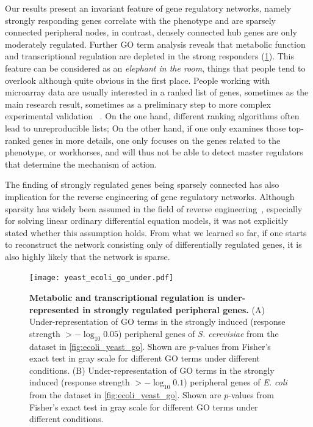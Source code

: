 Our results present an invariant feature of gene regulatory
networks, namely strongly responding genes correlate with
the phenotype and are sparsely connected peripheral nodes, 
in contrast, densely connected hub genes are only moderately
regulated. Further GO term analysis reveals that metabolic
function and transcriptional regulation are depleted in the
strong responders (\ref{fig:ecoli_yeast_go_under}).
This feature can be considered as an \emph{elephant in the room},
things that people tend to overlook although quite obvious
in the first place. People working with microarray data are
usually interested in a ranked list of genes, sometimes as the 
main research result, sometimes as a
preliminary step to more complex experimental validation~%
\citep{Boulesteix2009,Smyth2004}. On the one hand, different ranking
algorithms often lead to unreproducible lists; On the other
hand, if one only examines those top-ranked genes in more
details, one only focuses on the genes related to the phenotype,
or workhorses, and will thus not be able to detect master regulators
that determine the mechanism of action.

The finding of strongly regulated genes being sparsely connected
has also implication for the reverse engineering of gene regulatory
networks. Although sparsity has widely been assumed in the field
of reverse engineering~\citep{Yeung2002,Gardner2003}, especially
for solving linear ordinary differential equation models, it was
not explicitly stated whether this assumption holds. From what
we learned so far, if one starts to reconstruct the network consisting only of
differentially regulated genes, it is also highly likely that
the network is sparse.

\begin{figure}[!ht]
\begin{center}
\texttt{[image: yeast\_ecoli\_go\_under.pdf]}
\end{center}
\caption[GO term depletion of strongly regulated genes]{
{\bf Metabolic and transcriptional regulation is under-represented in 
strongly regulated peripheral genes.}
(A) Under-representation of GO
terms in the strongly induced (response strength $> -\log_{10}0.05$) 
peripheral genes of \emph{S. cerevisiae} from
the dataset in \ref{fig:ecoli_yeast_go}. Shown 
are $p$-values
from Fisher's exact test in gray scale for different GO terms under different 
conditions.
(B) Under-representation of GO terms
in the strongly induced (response strength $> -\log_{10}0.1$) peripheral genes 
of \emph{E. coli} from the dataset 
in \ref{fig:ecoli_yeast_go}. Shown are $p$-values
from Fisher's exact test in gray scale for different GO terms under different 
conditions. 
}
\label{fig:ecoli_yeast_go_under}
\end{figure}


